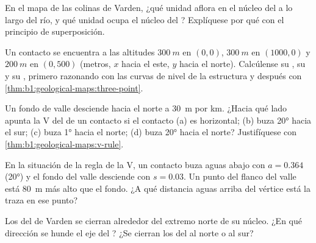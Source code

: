 \begin{exercise}[$\star$]\label{exo:b1:geological-maps:4}
En el mapa de las colinas de Varden, ¿qué unidad aflora en el núcleo del  a lo largo del
río, y qué unidad ocupa el núcleo del ? Explíquese por qué con el principio de superposición.
\end{exercise}

\begin{exercise}[$\star\star$]\label{exo:b1:geological-maps:5}
Un contacto se encuentra a las altitudes $\qty{300}{m}$ en $(0, 0)$, $\qty{300}{m}$ en $(1000, 0)$ y
$\qty{200}{m}$ en $(0, 500)$ (metros, $x$ hacia el este, $y$ hacia el norte). Calcúlense su , su
 y su , primero razonando con las curvas de nivel de la estructura
y después con \cref{thm:b1:geological-maps:three-point}.
\end{exercise}

\begin{exercise}[$\star\star$]\label{exo:b1:geological-maps:6}
Un fondo de valle desciende hacia el norte a \qty{30}{m} por km. ¿Hacia qué lado apunta la V del
 de un contacto si el contacto (a) es horizontal; (b) buza \ang{20} hacia el sur;
(c) buza \ang{1} hacia el norte; (d) buza \ang{20} hacia el norte? Justifíquese con
\cref{thm:b1:geological-maps:v-rule}.
\end{exercise}

\begin{exercise}[$\star\star$]\label{exo:b1:geological-maps:7}
En la situación de la regla de la V, un contacto buza aguas abajo con $a = 0.364$ (\ang{20}) y el
fondo del valle desciende con $s = 0.03$. Un punto del flanco del valle está \qty{80}{m} más alto
que el fondo. ¿A qué distancia aguas arriba del vértice está la traza en ese punto?
\end{exercise}

\begin{exercise}[$\star\star$]\label{exo:b1:geological-maps:8}
Los  del  de Varden se cierran alrededor del extremo norte de su núcleo.
¿En qué dirección se hunde el eje del ? ¿Se cierran los  del  al norte
o al sur?
\end{exercise}

